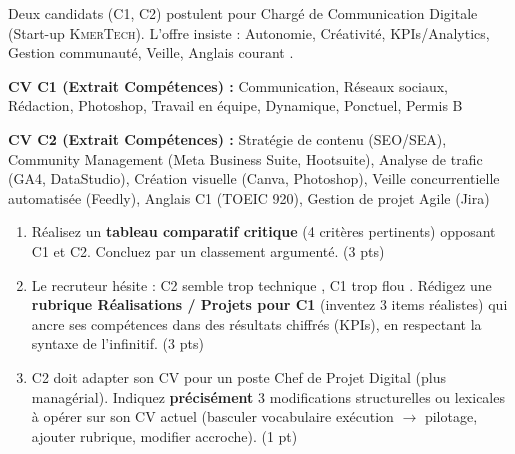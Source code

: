 \documentclass[11pt]{article}
\begin{document}
\begin{exercice}
Deux candidats (C1, C2) postulent pour \og Chargé de Communication Digitale \fg{} (Start-up \textsc{KmerTech}). L'offre insiste : \og Autonomie, Créativité, KPIs/Analytics, Gestion communauté, Veille, Anglais courant \fg{}.

\textbf{CV C1 (Extrait Compétences) :}
\og Communication, Réseaux sociaux, Rédaction, Photoshop, Travail en équipe, Dynamique, Ponctuel, Permis B \fg{}

\textbf{CV C2 (Extrait Compétences) :}
\og Stratégie de contenu (SEO/SEA), Community Management (Meta Business Suite, Hootsuite), Analyse de trafic (GA4, DataStudio), Création visuelle (Canva, Photoshop), Veille concurrentielle automatisée (Feedly), Anglais C1 (TOEIC 920), Gestion de projet Agile (Jira) \fg{}

\begin{enumerate}
    \item Réalisez un \textbf{tableau comparatif critique} (4 critères pertinents) opposant C1 et C2. Concluez par un classement argumenté. (3 pts)
    \item Le recruteur hésite : C2 semble \og trop technique \fg{}, C1 \og trop flou \fg{}. Rédigez une \textbf{rubrique \og Réalisations / Projets \fg{} pour C1} (inventez 3 items réalistes) qui ancre ses compétences dans des résultats chiffrés (KPIs), en respectant la syntaxe de l'infinitif. (3 pts)
    \item C2 doit adapter son CV pour un poste \og Chef de Projet Digital \fg{} (plus managérial). Indiquez \textbf{précisément} 3 modifications structurelles ou lexicales à opérer sur son CV actuel (basculer vocabulaire exécution $\rightarrow$ pilotage, ajouter rubrique, modifier accroche). (1 pt)
\end{enumerate}
\end{exercice}
\end{document}
